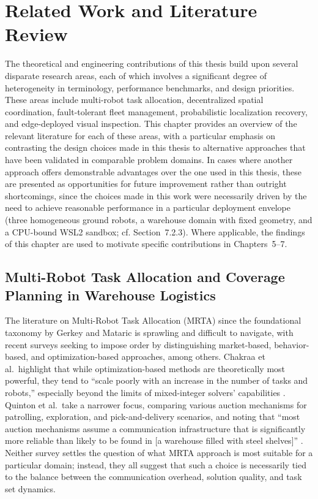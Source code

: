\chapter{Related Work and Literature Review\label{cha:chapter3}}

The theoretical and engineering contributions of this thesis build upon several disparate research areas, each of which involves a significant degree of heterogeneity in terminology, performance benchmarks, and design priorities. These areas include multi-robot task allocation, decentralized spatial coordination, fault-tolerant fleet management, probabilistic localization recovery, and edge-deployed visual inspection. This chapter provides an overview of the relevant literature for each of these areas, with a particular emphasis on contrasting the design choices made in this thesis to alternative approaches that have been validated in comparable problem domains. In cases where another approach offers demonstrable advantages over the one used in this thesis, these are presented as opportunities for future improvement rather than outright shortcomings, since the choices made in this work were necessarily driven by the need to achieve reasonable performance in a particular deployment envelope (three homogeneous ground robots, a warehouse domain with fixed geometry, and a CPU-bound WSL2 sandbox; cf. Section~7.2.3). Where applicable, the findings of this chapter are used to motivate specific contributions in Chapters~5--7.

\section{Multi-Robot Task Allocation and Coverage Planning in Warehouse Logistics}

The literature on Multi-Robot Task Allocation (MRTA) since the foundational taxonomy by Gerkey and Mataric is sprawling and difficult to navigate, with recent surveys seeking to impose order by distinguishing market-based, behavior-based, and optimization-based approaches, among others. Chakraa et al.\ highlight that while optimization-based methods are theoretically most powerful, they tend to ``scale poorly with an increase in the number of tasks and robots,'' especially beyond the limits of mixed-integer solvers' capabilities \cite{chakraa2023optimization}. Quinton et al.\ take a narrower focus, comparing various auction mechanisms for patrolling, exploration, and pick-and-delivery scenarios, and noting that ``most auction mechanisms assume a communication infrastructure that is significantly more reliable than likely to be found in [a warehouse filled with steel shelves]'' \cite{quinton2023market}. Neither survey settles the question of what MRTA approach is most suitable for a particular domain; instead, they all suggest that such a choice is necessarily tied to the balance between the communication overhead, solution quality, and task set dynamics.

